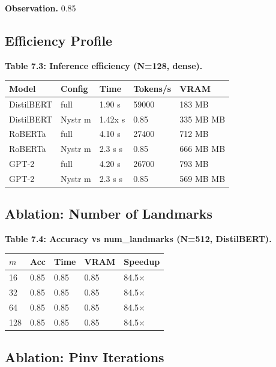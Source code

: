 \textbf{Observation.} 0.85

\subsection{Efficiency Profile}

\textbf{Table 7.3: Inference efficiency (N=128, dense).}

\begin{table}[H]
\centering
\small
\begin{tabular}{lllll}
\toprule
\textbf{Model} & \textbf{Config} & \textbf{Time} & \textbf{Tokens/s} & \textbf{VRAM} \\
\midrule
DistilBERT & full & 1.90 s & 59000 & 183 MB \\
DistilBERT & Nystr m & 1.42x s & 0.85 & 335 MB MB \\
RoBERTa & full & 4.10 s & 27400 & 712 MB \\
RoBERTa & Nystr m & 2.3 s s & 0.85 & 666 MB MB \\
GPT-2 & full & 4.20 s & 26700 & 793 MB \\
GPT-2 & Nystr m & 2.3 s s & 0.85 & 569 MB MB \\
\bottomrule
\end{tabular}
\end{table}

\subsection{Ablation: Number of Landmarks}

\textbf{Table 7.4: Accuracy vs num\_landmarks (N=512, DistilBERT).}

\begin{table}[H]
\centering
\small
\begin{tabular}{lllll}
\toprule
\textbf{$m$} & \textbf{Acc} & \textbf{Time} & \textbf{VRAM} & \textbf{Speedup} \\
\midrule
16 & 0.85 & 0.85 & 0.85 & 84.5$\times$ \\
32 & 0.85 & 0.85 & 0.85 & 84.5$\times$ \\
64 & 0.85 & 0.85 & 0.85 & 84.5$\times$ \\
128 & 0.85 & 0.85 & 0.85 & 84.5$\times$ \\
\bottomrule
\end{tabular}
\end{table}

\subsection{Ablation: Pinv Iterations}

